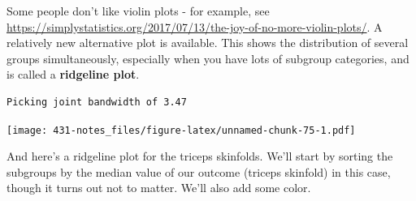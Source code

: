 \documentclass[
]{book}
\newenvironment{Shaded}{\begin{snugshade}}{\end{snugshade}}
\newcommand{\DataTypeTok}[1]{\textcolor[rgb]{0.13,0.29,0.53}{#1}}
\newcommand{\FloatTok}[1]{\textcolor[rgb]{0.00,0.00,0.81}{#1}}
\newcommand{\KeywordTok}[1]{\textcolor[rgb]{0.13,0.29,0.53}{\textbf{#1}}}
\newcommand{\NormalTok}[1]{#1}
\newcommand{\OperatorTok}[1]{\textcolor[rgb]{0.81,0.36,0.00}{\textbf{#1}}}
\newcommand{\StringTok}[1]{\textcolor[rgb]{0.31,0.60,0.02}{#1}}
\begin{document}
Some people don't like violin plots - for example, see \url{https://simplystatistics.org/2017/07/13/the-joy-of-no-more-violin-plots/}. A relatively new alternative plot is available. This shows the distribution of several groups simultaneously, especially when you have lots of subgroup categories, and is called a \textbf{ridgeline plot}.

\begin{Shaded}
\end{Shaded}

\begin{verbatim}
Picking joint bandwidth of 3.47
\end{verbatim}

\texttt{[image: 431-notes\_files/figure-latex/unnamed-chunk-75-1.pdf]}

And here's a ridgeline plot for the triceps skinfolds. We'll start by sorting the subgroups by the median value of our outcome (triceps skinfold) in this case, though it turns out not to matter. We'll also add some color.
\end{document}
